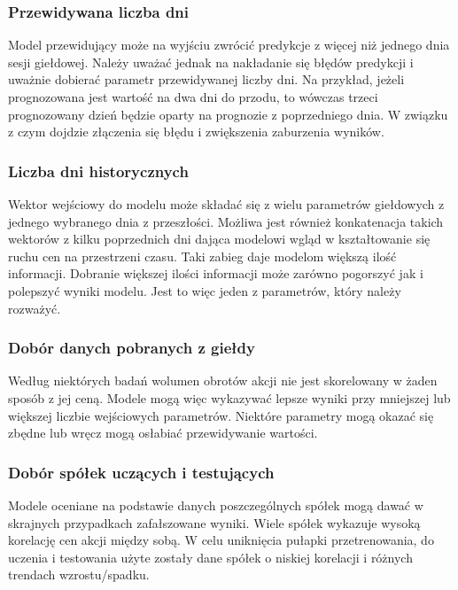 \documentclass[a4paper, twoside, 11pt, openright]{article}
\begin{document}
\subsubsection{Przewidywana liczba dni}

Model przewidujący może na wyjściu zwrócić predykcje z więcej niż jednego dnia sesji giełdowej. Należy uważać jednak na nakładanie się błędów predykcji i uważnie dobierać parametr przewidywanej liczby dni. Na przykład, jeżeli prognozowana jest wartość na dwa dni do przodu, to wówczas trzeci prognozowany dzień będzie oparty na prognozie z poprzedniego dnia. W związku z czym dojdzie złączenia się błędu i zwiększenia zaburzenia wyników.

\subsubsection{Liczba dni historycznych}

Wektor wejściowy do modelu może składać się z wielu parametrów giełdowych z jednego wybranego dnia z przeszłości. Możliwa jest również konkatenacja takich wektorów z kilku poprzednich dni dająca modelowi wgląd w kształtowanie się ruchu cen na przestrzeni czasu. Taki zabieg daje modelom większą ilość informacji. Dobranie większej ilości informacji może zarówno pogorszyć jak i polepszyć wyniki modelu. Jest to więc jeden z parametrów, który należy rozważyć.

\subsubsection{Dobór danych pobranych z giełdy}

Według niektórych badań wolumen obrotów akcji nie jest skorelowany w żaden sposób z jej ceną. Modele mogą więc wykazywać lepsze wyniki przy mniejszej lub większej liczbie wejściowych parametrów. Niektóre parametry mogą okazać się zbędne lub wręcz mogą osłabiać przewidywanie wartości.

\subsubsection{Dobór spółek uczących i testujących}

Modele oceniane na podstawie danych poszczególnych spółek mogą dawać w skrajnych przypadkach zafałszowane wyniki. Wiele spółek wykazuje wysoką korelację cen akcji między sobą. W celu uniknięcia pułapki przetrenowania, do uczenia i testowania użyte zostały dane spółek o niskiej korelacji i różnych trendach wzrostu/spadku.
\end{document}

